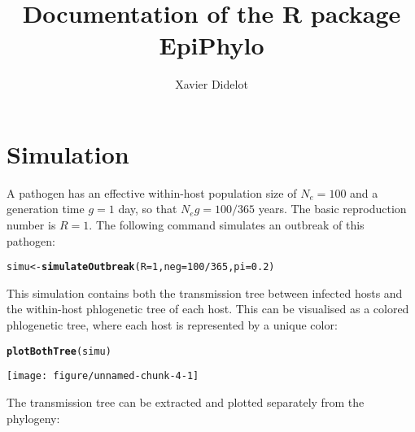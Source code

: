 \documentclass[a4paper]{article}\usepackage[]{graphicx}\usepackage[]{color}
\title{Documentation of the R package EpiPhylo}
\author{Xavier Didelot}
\makeatletter
\newcommand{\hlnum}[1]{\textcolor[rgb]{0.686,0.059,0.569}{#1}}%
\newcommand{\hlopt}[1]{\textcolor[rgb]{0,0,0}{#1}}%
\newcommand{\hlstd}[1]{\textcolor[rgb]{0.345,0.345,0.345}{#1}}%
\newcommand{\hlkwb}[1]{\textcolor[rgb]{0.69,0.353,0.396}{#1}}%
\newcommand{\hlkwc}[1]{\textcolor[rgb]{0.333,0.667,0.333}{#1}}%
\newcommand{\hlkwd}[1]{\textcolor[rgb]{0.737,0.353,0.396}{\textbf{#1}}}%
\newenvironment{kframe}{%
 \def\at@end@of@kframe{}%
 \ifinner\ifhmode%
  \def\at@end@of@kframe{\end{minipage}}%
  \begin{minipage}{\columnwidth}%
 \fi\fi%
 \def\FrameCommand##1{\hskip\@totalleftmargin \hskip-\fboxsep
 \colorbox{shadecolor}{##1}\hskip-\fboxsep
     \hskip-\linewidth \hskip-\@totalleftmargin \hskip\columnwidth}%
 \MakeFramed {\advance\hsize-\width
   \@totalleftmargin\z@ \linewidth\hsize
   \@setminipage}}%
 {\par\unskip\endMakeFramed%
 \at@end@of@kframe}
\newenvironment{knitrout}{}{} %
\makeatother
\begin{document}


\maketitle



\section{Simulation}

A pathogen has an effective within-host population size of $N_e=100$ and a generation time $g=1$ day, so that $N_e g=100/365$ years. The basic reproduction number is $R=1$. The following command simulates an outbreak of this pathogen: 
\begin{knitrout}
\color{fgcolor}\begin{kframe}
\begin{alltt}
\hlstd{simu} \hlkwb{<-} \hlkwd{simulateOutbreak}\hlstd{(}\hlkwc{R}\hlstd{=}\hlnum{1}\hlstd{,}\hlkwc{neg}\hlstd{=}\hlnum{100}\hlopt{/}\hlnum{365}\hlstd{,}\hlkwc{pi}\hlstd{=}\hlnum{0.2}\hlstd{)}
\end{alltt}
\end{kframe}
\end{knitrout}

This simulation contains both the transmission tree between infected hosts and the within-host phlogenetic tree of each host. This can be visualised as a colored phlogenetic tree, where each host is represented by a unique color:

\begin{center}
\begin{knitrout}
\color{fgcolor}\begin{kframe}
\begin{alltt}
\hlkwd{plotBothTree}\hlstd{(simu)}
\end{alltt}
\end{kframe}

{\centering \texttt{[image: figure/unnamed-chunk-4-1]} 

}



\end{knitrout}
\end{center}

The transmission tree can be extracted and plotted separately from the phylogeny:
\end{document}
